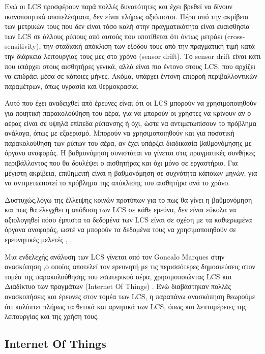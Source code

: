 Ενώ οι LCS προσφέρουν παρά πολλές δυνατότητες και έχει βρεθεί να δίνουν ικανοποιητικά αποτελέσματα, δεν είναι πλήρως αξιόπιστοι.
Πέρα από την ακρίβεια των μετρικών τους που δεν είναι τόσο καλή  στην πραγματικότητα είναι ευαισθησία των LCS σε άλλους ρύπους από αυτούς που υποτίθεται ότι όντως μετράει (cross-sensitivity), 
την σταδιακή απόκλιση των εξόδου τους από την πραγματική τιμή κατά την διάρκεια λειτουργίας τους μες στο χρόνο (sensor drift).
Το sensor drift είναι κάτι που υπάρχει στους αισθητήρες γενικά, αλλά είναι πιο έντονο στους LCS, που αρχίζει να επιδράει μέσα σε κάποιες μήνες.
Ακόμα, υπάρχει έντονη επιρροή περιβαλλοντικών παραμέτρων, όπως υγρασία και θερμοκρασία.

Αυτό που έχει αναδειχθεί από έρευνες είναι ότι οι LCS μπορούν να χρησιμοποιηθούν για ποιητική παρακολούθηση του αέρα, για να μπορούν οι χρήστες να κρίνουν αν ο αέρας είναι σε υψηλά επίπεδα ρύπανσης ή όχι,
ώστε να αντιμετωπίσουν το πρόβλημα ανάλογα, όπως με εξαερισμό.
Μπορούν να χρησιμοποιηθούν και για ποσοτική παρακολούθηση των ρύπων του αέρα, αν έχει υπάρξει διαδικασία βαθμονόμησης με όργανο αναφοράς.
Η βαθμονόμηση συνιστάται να γίνεται στις πραγματικές συνθήκες περιβάλλοντος που θα δουλέψει ο αισθητήρας και όχι μόνο σε εργαστήριο.
Για μέγιστη ακρίβεια, επιθημειτή είναι η βαθμονόμηση σε συχνότητα κάποιων μηνών, για να αντιμετωπιστεί το πρόβλημα της απόκλισης του αισθητήρα ανά το χρόνο.

Δυστυχώς,λόγω της έλλειψης κοινών προτύπων για το πως θα γίνει η βαθμονόμηση και πως θα έλεγχθει η απόδοση των LCS σε κάθε ερεύνα,
δεν είναι εύκολα να αξιολογηθεί πόσο έμπιστα τα δεδομένα των LCS είναι σε σχέση με τα καθιερωμένα όργανα αναφοράς,
ωστέ να μπορούν τα δεδομένα τους να χρησιμοποιηθούν σε ερευνητικές μελετές \cite{SA2022102551}, \cite{CHOJER2020138385}.

Μια ενδελεχής ανάλυση των LCS γίνεται από τον Goncalo Marques στην ανασκόπηση \cite{Garcia2022},ο οποίος αποτελεί τον ερευνητή με τις περισσότερες δημοσιεύσεις στον τομέα της παρακολούθησης του εσωτερικού αέρα,
χρησιμοποιώντας LCS και Διαδίκτυο των πραγμάτων (Internet Of Things) \cite{Tan2024}.
Ενώ διαβάστηκαν πολλές ανασκοπήσεις και έρευνες στον τομέα των LCS, η παραπάνω ανασκόπηση θεωρούμε ότι καλύπτει πλήρως τα θετικά και αρνητικά των LCS, όπως και λεπτομέρειες της λειτουργίας και της χρήση τους.



\subsection{Internet Of Things}

